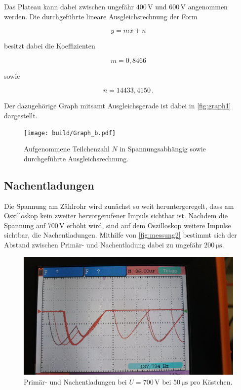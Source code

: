 Das Plateau kann dabei zwischen ungefähr $400 \,\unit{\volt}$ und $600 \,\unit{\volt}$ angenommen werden.
Die durchgeführte lineare Ausgleichsrechnung der Form

\begin{equation*}
      y = m x + n
\end{equation*}

besitzt dabei die Koeffizienten

\begin{equation*} %
      m = 0,8466 %
\end{equation*}

sowie

\begin{equation*} %
      n = 14433,4150 \,.
\end{equation*}

Der dazugehörige Graph mitsamt Ausgleichsgerade ist dabei in \autoref{fig:graph1} dargestellt.

\begin{figure}
    \centering
    \texttt{[image: build/Graph\_b.pdf]}
    \caption{Aufgenommene Teilchenzahl $N$ in Spannungsabhängig sowie durchgeführte Ausgleichsrechnung.}
    \label{fig:graph1}
\end{figure}


\subsection{Nachentladungen}

Die Spannung am Zählrohr wird zunächst so weit heruntergeregelt, dass am Oszilloskop kein zweiter hervorgerufener Impuls sichtbar ist.
Nachdem die Spannung auf $700 \,\unit{\volt}$ erhöht wird, sind auf dem Oszilloskop weitere Impulse sichtbar, die Nachentladungen.
Mithilfe von \autoref{fig:messung2} bestimmt sich der Abstand zwischen Primär- und Nachentladung dabei zu ungefähr $200 \,\unit{\micro\second}$.

\begin{figure}
    \centering
    \includegraphics[scale=0.2]{figures/messung2.jpeg}
    \caption{Primär- und Nachentladungen bei $U = 700 \,\unit{\volt}$ bei $50 \,\unit{\micro\second}$ pro Kästchen.}
    \label{fig:messung2}
\end{figure}


